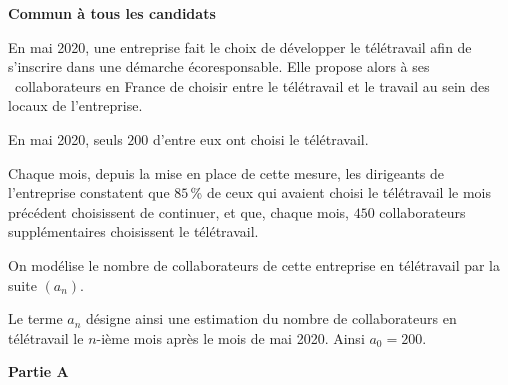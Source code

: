 \textbf{Commun à tous les candidats}

\medskip

En mai 2020, une entreprise fait le choix de développer le télétravail afin de s'inscrire dans une démarche écoresponsable.
Elle propose alors à ses ~collaborateurs en France de choisir entre le télétravail et le travail au sein des locaux de l'entreprise.

En mai 2020, seuls $200$ d'entre eux ont choisi le télétravail.

Chaque mois, depuis la mise en place de cette mesure, les dirigeants de l'entreprise constatent que $85$\,\% de ceux qui avaient choisi le télétravail le mois précédent choisissent de continuer, et que, chaque mois, $450$ collaborateurs supplémentaires choisissent le télétravail.

On modélise le nombre de collaborateurs de cette entreprise en télétravail par la suite $\left(a_n\right)$.

Le terme $a_n$ désigne ainsi une estimation du nombre de collaborateurs en télétravail le $n$-ième mois après le mois de mai 2020. Ainsi $a_0 = 200$.

\bigskip

\textbf{Partie A}

\medskip


